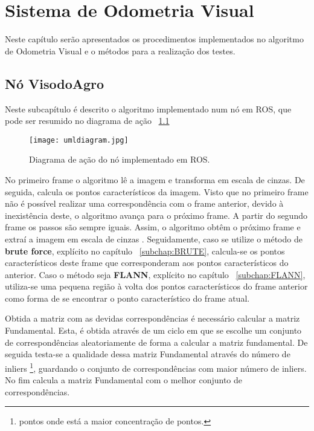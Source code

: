 \chapter{Sistema de Odometria Visual} \label{chap:sist}

Neste capítulo serão apresentados os procedimentos implementados no algoritmo de Odometria Visual e o métodos para a realização dos testes.


\section{Nó VisodoAgro}

Neste subcapítulo é descrito o algoritmo implementado num nó em ROS, que pode ser resumido no diagrama de ação ~\ref{fig:diaguml}

\begin{figure}[h!] %
	\begin{center}
		\leavevmode		
		\texttt{[image: umldiagram.jpg]}
		\caption{Diagrama de ação do nó implementado em ROS.}
		\label{fig:diaguml}
	\end{center}
\end{figure}



No primeiro frame o algoritmo lê a imagem e transforma em escala de cinzas. De seguida, calcula os pontos característicos da imagem. Visto que no primeiro frame não é possível realizar uma correspondência com o frame anterior, devido à inexistência deste, o algoritmo avança para o próximo frame. A partir do segundo frame os passos são sempre iguais. Assim, o algoritmo obtêm o próximo frame e extraí a imagem em escala de cinzas . Seguidamente, caso se utilize o método de \textbf{brute force}, explícito no capítulo ~\ref{subchap:BRUTE}, calcula-se os pontos característicos deste frame que corresponderam aos pontos característicos do anterior. Caso o método seja \textbf{FLANN}, explícito no capítulo ~\ref{subchap:FLANN}, utiliza-se uma pequena região à volta dos pontos característicos do frame anterior como forma de se encontrar o ponto característico do frame atual. 


Obtida a matriz com as devidas correspondências é necessário calcular a matriz Fundamental. Esta, é obtida através de um ciclo em que se escolhe um conjunto de correspondências aleatoriamente de forma a calcular a matriz fundamental. De seguida testa-se a qualidade dessa matriz Fundamental através do número de inliers \footnote{pontos onde está a maior concentração de pontos.}, guardando o conjunto de correspondências com maior número de inliers. No fim calcula a matriz Fundamental com o melhor conjunto de correspondências.

